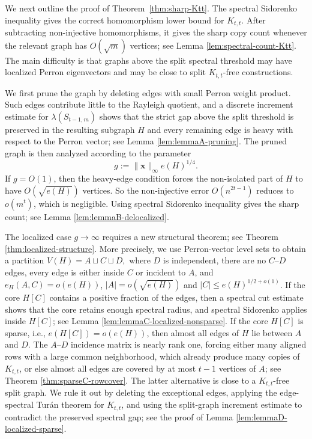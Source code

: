 \documentclass[10pt,a4paper]{amsart}
\begin{document}
We next outline the proof of Theorem~\ref{thm:sharp-Ktt}.  The spectral
Sidorenko inequality gives the correct homomorphism lower bound for
\(K_{t,t}\).  After subtracting non-injective homomorphisms, it gives the
sharp copy count whenever the relevant graph has \(O(\sqrt m)\) vertices; see Lemma \ref{lem:spectral-count-Ktt}. 
The main difficulty is that graphs above the split spectral threshold may
have localized Perron eigenvectors and may be close to split
\(K_{t,t}\)-free constructions.

We first prune the graph by deleting edges with small Perron weight 
product.  Such edges contribute little to the Rayleigh quotient, and a
discrete increment estimate for \(\lambda(S_{t-1,m})\) shows that the
strict gap above the split threshold is preserved in the resulting subgraph \(H\) and every remaining edge is heavy with respect to the Perron vector; see Lemma \ref{lem:lemmaA-pruning}. The pruned graph is then analyzed according to the parameter 
\[
        g:=\|\bm{x}\|_\infty e(H)^{1/4}.
\]
If \(g=O(1)\), then the heavy-edge condition forces the non-isolated part of
\(H\) to have \(O(\sqrt{e(H)})\) vertices. So the non-injective error $O(n^{2t-1})$ reduces to  $o(m^t)$, which is
negligible. Using spectral Sidorenko inequality  gives the sharp count; see Lemma \ref{lem:lemmaB-delocalized}.

The localized case \(g\to\infty\) requires a new structural theorem; see Theorem \ref{thm:localized-structure}. More precisely, we use
Perron-vector level sets to obtain a partition
        $V(H)=A\sqcup C\sqcup D,$
where \(D\) is independent, there are no \(C\)--\(D\) edges, every edge
is either inside \(C\) or incident to \(A\), and
$e_H(A,C)=o(e(H))$, $|A|=o(\sqrt{e(H)})$ and 
$ |C|\le e(H)^{1/2+o(1)}$. 
If the core \(H[C]\) contains a positive fraction of the edges, then a spectral cut estimate shows that
the core retains enough spectral radius, and spectral Sidorenko applies
inside \(H[C]\); see Lemma \ref{lem:lemmaC-localized-nonsparse}.  
If the core $H[C]$ is sparse, i.e., $e(H[C])=o(e(H))$, 
then almost all edges of $H$ lie between
\(A\) and \(D\).  The \(A\)--\(D\) incidence matrix is nearly rank one,
forcing either many aligned rows with a large common neighborhood, which
already produce many copies of \(K_{t,t}\), or else almost all edges are
covered by at most \(t-1\) vertices of \(A\); see Theorem \ref{thm:sparseC-rowcover}. 
The latter alternative is
close to a \(K_{t,t}\)-free split graph.  We rule it out by deleting the
exceptional edges, applying the edge-spectral Tur\'an theorem for
\(K_{t,t}\), and using the split-graph increment estimate to contradict
the preserved spectral gap; see the proof of Lemma \ref{lem:lemmaD-localized-sparse}. 
\end{document}
